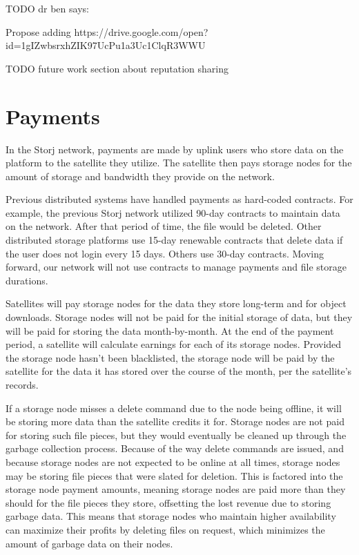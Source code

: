 \documentclass[11pt,fleqn,openany]{book}
\newcommand{\todo}[1]{{\color{red} TODO #1 }}
\begin{document}
\todo{dr ben says:

Propose adding https://drive.google.com/open?id=1gIZwbsrxhZIK97UcPu1a3Uc1ClqR3WWU
}

\todo{future work section about reputation sharing}

\section{Payments}\label{sec:concrete-payments}

In the Storj network, payments are made by uplink users who store data on the
platform to the satellite they utilize.
The satellite then pays storage nodes for the amount of storage and bandwidth
they
provide on the network.

Previous distributed systems have handled payments as hard-coded contracts.
For example, the previous Storj network utilized 90-day contracts to maintain
data on the network. After that period of time, the file would be deleted.
Other distributed storage platforms use 15-day renewable contracts that delete
data if the user does not login every 15 days. Others use 30-day contracts.
Moving forward, our network will not use contracts to manage payments and file
storage durations.

Satellites will pay storage nodes for the data they store long-term
and for object downloads.
Storage nodes will not be paid for the initial storage of data, but they
will be paid for storing the data month-by-month. At the end of the payment
period, a satellite will calculate earnings for each of its storage nodes.
Provided the storage node hasn't been blacklisted,
the storage node will be paid by the satellite for the data it has stored
over the course of
the month, per the satellite's records.

If a storage node misses a delete command due to the node being
offline, it will be storing more data than the satellite credits it for.
Storage nodes are not paid for storing such file pieces, but they
would eventually be cleaned up through the garbage collection process.
Because of the
way delete commands are issued, and because storage nodes are not expected to be
online at all times, storage nodes may be storing file pieces that were slated
for
deletion. This is factored into
the storage node payment amounts, meaning storage nodes are paid more than they
should for the file pieces they store, offsetting the lost revenue due to
storing garbage data.
This means that storage nodes who maintain higher availability
can maximize their profits by deleting files on request,
which minimizes the amount
of garbage data on their nodes.
\end{document}
